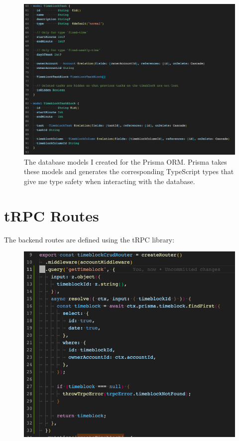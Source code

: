 \documentclass[notitlepage, 12pt]{report}
\begin{document}
\begin{figure}[H]
	\caption{The database models I created for the Prisma ORM. Prisma takes these models and generates the corresponding TypeScript types that give me type safety when interacting with the database.}
	\includegraphics[width=1\textwidth]{backend-database-models.png}
\end{figure}

\newpage

\section*{tRPC Routes}

The backend routes are defined using the tRPC library:

\begin{figure}[H]
	\includegraphics[width=1\textwidth]{backend-trpc-routes.png}
\end{figure}
\end{document}
